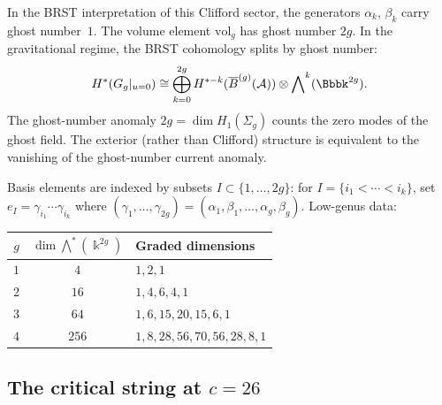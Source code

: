 \begin{remark}
\label{rem:g9-ghost-number}
In the BRST interpretation of this Clifford sector, the generators
$\alpha_k$, $\beta_k$ carry ghost number~$1$. The volume element
$\mathrm{vol}_g$ has ghost number $2g$. In the gravitational regime,
the BRST cohomology splits by ghost number:
\[
H^*(G_g|_{u=0}) \cong
\bigoplus_{k=0}^{2g} H^{*-k}(\barB^{(g)}(\cA))
\otimes \bigwedge\nolimits^k(\Bbbk^{2g}).
\]
The ghost-number anomaly $2g = \dim H_1(\Sigma_g)$ counts the zero
modes of the ghost field. The exterior (rather than Clifford) structure
is equivalent to the vanishing of the ghost-number current anomaly.
\end{remark}

\begin{remark}
\label{rem:g9-exterior-basis}
Basis elements are indexed by subsets $I \subset \{1, \ldots, 2g\}$:
for $I = \{i_1 < \cdots < i_k\}$, set $e_I = \gamma_{i_1}\cdots
\gamma_{i_k}$ where $(\gamma_1, \ldots, \gamma_{2g}) =
(\alpha_1, \beta_1, \ldots, \alpha_g, \beta_g)$.
Low-genus data:
\begin{center}
\renewcommand{\arraystretch}{1.2}
\begin{tabular}{ccl}
\toprule
$g$ & $\dim\bigwedge^*(\Bbbk^{2g})$ & Graded dimensions \\
\midrule
$1$ & $4$ & $1, 2, 1$ \\
$2$ & $16$ & $1, 4, 6, 4, 1$ \\
$3$ & $64$ & $1, 6, 15, 20, 15, 6, 1$ \\
$4$ & $256$ & $1, 8, 28, 56, 70, 56, 28, 8, 1$ \\
\bottomrule
\end{tabular}
\end{center}
\end{remark}

%
%

\subsection{The critical string at $c = 26$}
\label{subsec:critical-c26}

